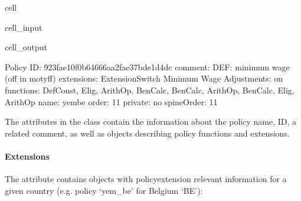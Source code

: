 \documentclass[letterpaper,10pt,english]{sphinxmanual}
\begin{document}
\begin{sphinxuseclass}{cell}
\begin{sphinxuseclass}{cell_input}
\begin{sphinxVerbatim}[commandchars=\\\{\}]
\PYG{p}{[}\PYG{p}{]}\PYG{p}{[}\PYG{p}{]}
\end{sphinxVerbatim}

\end{sphinxuseclass}
\begin{sphinxuseclass}{cell_output}
\begin{sphinxVerbatim}[commandchars=\\\{\}]
\PYGZhy{}\PYGZhy{}\PYGZhy{}\PYGZhy{}\PYGZhy{}\PYGZhy{}\PYGZhy{}\PYGZhy{}\PYGZhy{}\PYGZhy{}\PYGZhy{}\PYGZhy{}\PYGZhy{}\PYGZhy{}\PYGZhy{}\PYGZhy{}\PYGZhy{}\PYGZhy{}\PYGZhy{}\PYGZhy{}\PYGZhy{}\PYGZhy{}\PYGZhy{}\PYGZhy{}\PYGZhy{}\PYGZhy{}\PYGZhy{}\PYGZhy{}\PYGZhy{}\PYGZhy{}
Policy
\PYGZhy{}\PYGZhy{}\PYGZhy{}\PYGZhy{}\PYGZhy{}\PYGZhy{}\PYGZhy{}\PYGZhy{}\PYGZhy{}\PYGZhy{}\PYGZhy{}\PYGZhy{}\PYGZhy{}\PYGZhy{}\PYGZhy{}\PYGZhy{}\PYGZhy{}\PYGZhy{}\PYGZhy{}\PYGZhy{}\PYGZhy{}\PYGZhy{}\PYGZhy{}\PYGZhy{}\PYGZhy{}\PYGZhy{}\PYGZhy{}\PYGZhy{}\PYGZhy{}\PYGZhy{}
	 ID: \PYGZsq{}923fae10\PYGZhy{}f0b6\PYGZhy{}4666\PYGZhy{}aa2f\PYGZhy{}ae37bde1d4dc\PYGZsq{}
	 comment: \PYGZsq{}DEF: minimum wage  (off in motyff)\PYGZsq{}
	 extensions: ExtensionSwitch Minimum Wage Adjustments: on
	 functions: DefConst, Elig, ArithOp, BenCalc, BenCalc, ArithOp, BenCalc, Elig, ArithOp
	 name: \PYGZsq{}yem\PYGZus{}be\PYGZsq{}
	 order: \PYGZsq{}11\PYGZsq{}
	 private: \PYGZsq{}no\PYGZsq{}
	 spineOrder: \PYGZsq{}11\PYGZsq{}
\end{sphinxVerbatim}

\end{sphinxuseclass}
\end{sphinxuseclass}
\sphinxAtStartPar
The attributes in the  class contain the information about the policy name, ID, a related comment, as well as objects describing policy functions and extensions.


\paragraph{Extensions}
\label{\detokenize{notebooks/userguide:id1}}
\sphinxAtStartPar
The attribute  contains  objects with policy\sphinxhyphen{}extension relevant information for a given country (e.g. policy ‘yem\_be’ for Belgium ‘BE’):
\end{document}
